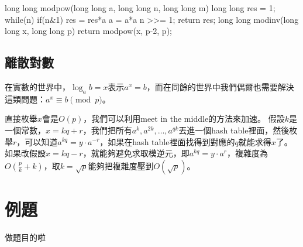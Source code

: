 \documentclass[main.tex]{subfiles}
\begin{document}
\begin{C++}
long long modpow(long long a, long long n, long long m) {
	long long res = 1;
	while(n) {
		if(n&1) res = res*a%
		a = a*a%
		n >>= 1;
	}
	return res;
}
long long modinv(long long x, long long p) {
	return modpow(x, p-2, p);
}
\end{C++}

\subsection{離散對數}
在實數的世界中，$\log_a b = x$表示$a^x = b$，而在同餘的世界中我們偶爾也需要解決這類問題：$a^x \equiv b \pmod p$。

直接枚舉$x$會是$O(p)$，我們可以利用meet in the middle的方法來加速。
假設$k$是一個常數，$x = kq+r$，我們把所有$a^k, a^{2k}, \dots, a^{qk}$丟進一個hash table裡面，然後枚舉$r$，可以知道$a^{kq} = y \cdot a^{-r}$，如果在hash table裡面找得到對應的$q$就能求得$x$了。如果改假設$x=kq-r$，就能夠避免求取模逆元，即$a^{kq} = y \cdot a^r$，複雜度為$O(\frac{p}{k} + k)$，取$k = \sqrt{p}$能夠把複雜度壓到$O(\sqrt{p})$。

\section{例題}
做題目的啦
\end{document}

